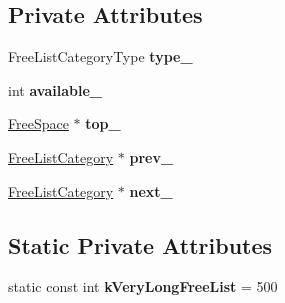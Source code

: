 \subsection*{Private Attributes}
\begin{DoxyCompactItemize}
\item 
Free\+List\+Category\+Type {\bfseries type\+\_\+}\hypertarget{classv8_1_1internal_1_1_free_list_category_a66a793a27ebffc0e7c7b1e8ca91449d6}{}\label{classv8_1_1internal_1_1_free_list_category_a66a793a27ebffc0e7c7b1e8ca91449d6}

\item 
int {\bfseries available\+\_\+}\hypertarget{classv8_1_1internal_1_1_free_list_category_a2531aaca395de934096006d10e9ad760}{}\label{classv8_1_1internal_1_1_free_list_category_a2531aaca395de934096006d10e9ad760}

\item 
\hyperlink{classv8_1_1internal_1_1_free_space}{Free\+Space} $\ast$ {\bfseries top\+\_\+}\hypertarget{classv8_1_1internal_1_1_free_list_category_a32ca97375506d09e02e41498fbf8e5a7}{}\label{classv8_1_1internal_1_1_free_list_category_a32ca97375506d09e02e41498fbf8e5a7}

\item 
\hyperlink{classv8_1_1internal_1_1_free_list_category}{Free\+List\+Category} $\ast$ {\bfseries prev\+\_\+}\hypertarget{classv8_1_1internal_1_1_free_list_category_a16948a10293811b73d9722cf82cee58c}{}\label{classv8_1_1internal_1_1_free_list_category_a16948a10293811b73d9722cf82cee58c}

\item 
\hyperlink{classv8_1_1internal_1_1_free_list_category}{Free\+List\+Category} $\ast$ {\bfseries next\+\_\+}\hypertarget{classv8_1_1internal_1_1_free_list_category_a611631e4766cb33392b570510e1dc62f}{}\label{classv8_1_1internal_1_1_free_list_category_a611631e4766cb33392b570510e1dc62f}

\end{DoxyCompactItemize}
\subsection*{Static Private Attributes}
\begin{DoxyCompactItemize}
\item 
static const int {\bfseries k\+Very\+Long\+Free\+List} = 500\hypertarget{classv8_1_1internal_1_1_free_list_category_ada19bec52214947adf5f4bf9f3bbabe3}{}\label{classv8_1_1internal_1_1_free_list_category_ada19bec52214947adf5f4bf9f3bbabe3}

\end{DoxyCompactItemize}
